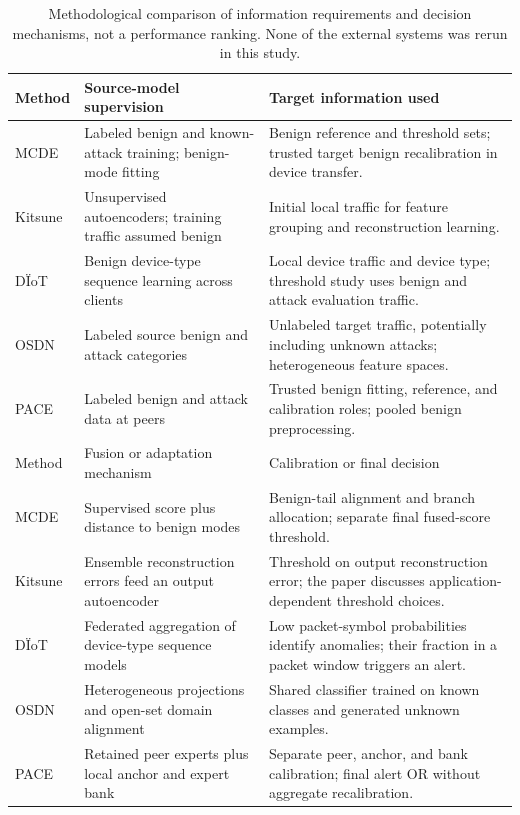 \begin{table}[!htbp]
\centering
\small
\caption{Methodological comparison of information requirements and decision mechanisms, not a performance ranking. None of the external systems was rerun in this study.}
\label{tab:prior}
\begin{tabular}{>{\raggedright\arraybackslash}p{2.1cm}>{\raggedright\arraybackslash}p{5.0cm}>{\raggedright\arraybackslash}p{7.1cm}}
\toprule
Method & Source-model supervision & Target information used \\
\midrule
MCDE~\cite{yue2026mcde} & Labeled benign and known-attack training; benign-mode fitting & Benign reference and threshold sets; trusted target benign recalibration in device transfer. \\
Kitsune~\cite{kitsune2018} & Unsupervised autoencoders; training traffic assumed benign & Initial local traffic for feature grouping and reconstruction learning. \\
D\"IoT~\cite{diot2019} & Benign device-type sequence learning across clients & Local device traffic and device type; threshold study uses benign and attack evaluation traffic. \\
OSDN~\cite{osdn2024} & Labeled source benign and attack categories & Unlabeled target traffic, potentially including unknown attacks; heterogeneous feature spaces. \\
PACE & Labeled benign and attack data at peers & Trusted benign fitting, reference, and calibration roles; pooled benign preprocessing. \\
\midrule
Method & Fusion or adaptation mechanism & Calibration or final decision \\
\midrule
MCDE & Supervised score plus distance to benign modes & Benign-tail alignment and branch allocation; separate final fused-score threshold. \\
Kitsune & Ensemble reconstruction errors feed an output autoencoder & Threshold on output reconstruction error; the paper discusses application-dependent threshold choices. \\
D\"IoT & Federated aggregation of device-type sequence models & Low packet-symbol probabilities identify anomalies; their fraction in a packet window triggers an alert. \\
OSDN & Heterogeneous projections and open-set domain alignment & Shared classifier trained on known classes and generated unknown examples. \\
PACE & Retained peer experts plus local anchor and expert bank & Separate peer, anchor, and bank calibration; final alert OR without aggregate recalibration. \\
\bottomrule
\end{tabular}
\end{table}
